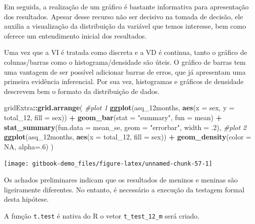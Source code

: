 \documentclass[
]{book}
\newenvironment{Shaded}{\begin{snugshade}}{\end{snugshade}}
\newcommand{\CommentTok}[1]{\textcolor[rgb]{0.56,0.35,0.01}{\textit{#1}}}
\newcommand{\DataTypeTok}[1]{\textcolor[rgb]{0.13,0.29,0.53}{#1}}
\newcommand{\DecValTok}[1]{\textcolor[rgb]{0.00,0.00,0.81}{#1}}
\newcommand{\FloatTok}[1]{\textcolor[rgb]{0.00,0.00,0.81}{#1}}
\newcommand{\KeywordTok}[1]{\textcolor[rgb]{0.13,0.29,0.53}{\textbf{#1}}}
\newcommand{\NormalTok}[1]{#1}
\newcommand{\OperatorTok}[1]{\textcolor[rgb]{0.81,0.36,0.00}{\textbf{#1}}}
\newcommand{\OtherTok}[1]{\textcolor[rgb]{0.56,0.35,0.01}{#1}}
\newcommand{\StringTok}[1]{\textcolor[rgb]{0.31,0.60,0.02}{#1}}
\begin{document}
Em seguida, a realização de um gráfico é bastante informativa para apresentação dos resultados. Apesar desse recurso não ser decisivo na tomada de decisão, ele auxilia a visualização da distribuição da variável que temos interesse, bem como oferece um entendimento inicial dos resultados.

Uma vez que a VI é tratada como discreta e a VD é continua, tanto o gráfico de colunas/barras como o histograma/densidade são úteis. O gráfico de barras tem uma vantagem de ser possível adicionar barras de erros, que já apresentam uma primeira evidência inferencial. Por sua vez, histogramas e gráficos de densidade descrevem bem o formato da distribuição de dados.

\begin{Shaded}
\begin{Highlighting}[]
\NormalTok{gridExtra}\OperatorTok{::}\KeywordTok{grid.arrange}\NormalTok{(}
  \CommentTok{#plot 1 }
  \KeywordTok{ggplot}\NormalTok{(asq_12months, }\KeywordTok{aes}\NormalTok{(}\DataTypeTok{x =}\NormalTok{ sex, }\DataTypeTok{y =}\NormalTok{ total_}\DecValTok{12}\NormalTok{, }\DataTypeTok{fill =}\NormalTok{ sex)) }\OperatorTok{+}
\StringTok{    }\KeywordTok{geom_bar}\NormalTok{(}\DataTypeTok{stat =} \StringTok{"summary"}\NormalTok{, }\DataTypeTok{fun =}\NormalTok{ mean) }\OperatorTok{+}
\StringTok{    }\KeywordTok{stat_summary}\NormalTok{(}\DataTypeTok{fun.data =}\NormalTok{ mean_se, }\DataTypeTok{geom =} \StringTok{"errorbar"}\NormalTok{, }
                 \DataTypeTok{width =} \FloatTok{.2}\NormalTok{),}
  \CommentTok{#plot 2}
    \KeywordTok{ggplot}\NormalTok{(asq_12months, }\KeywordTok{aes}\NormalTok{(}\DataTypeTok{x =}\NormalTok{ total_}\DecValTok{12}\NormalTok{, }\DataTypeTok{fill =}\NormalTok{ sex)) }\OperatorTok{+}\StringTok{ }
\StringTok{    }\KeywordTok{geom_density}\NormalTok{(}\DataTypeTok{color =} \OtherTok{NA}\NormalTok{, }\DataTypeTok{alpha=}\NormalTok{.}\DecValTok{6}\NormalTok{)}
\NormalTok{)}
\end{Highlighting}
\end{Shaded}

\begin{center}\texttt{[image: gitbook-demo\_files/figure-latex/unnamed-chunk-57-1]} \end{center}

Os achados preliminares indicam que os resultados de meninos e meninas são ligeiramente diferentes. No entanto, é necessário a execução da testagem formal desta hipótese.

A função \texttt{t.test} é nativa do R o vetor \texttt{t\_test\_12\_m} será criado.
\end{document}
